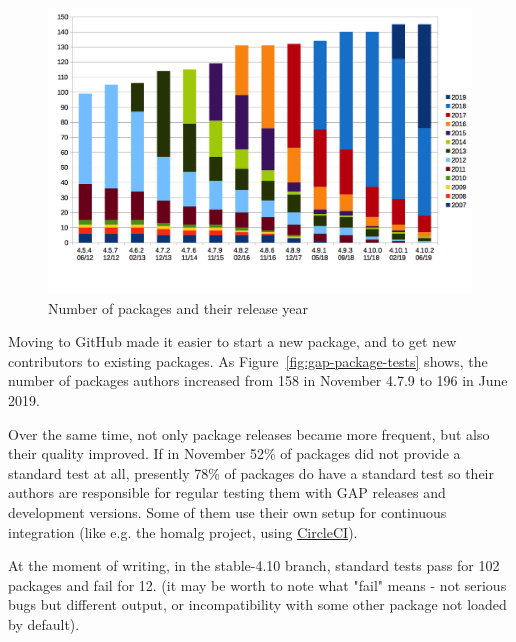 \documentclass{deliverablereport}
\begin{document}
\begin{figure}[!ht]
    \centering
    \includegraphics[width=\textwidth]{images/gap-package-releases}
    \caption{Number of \GAP packages and their release year}
    \label{fig:gap-package-releases}
\end{figure}

Moving to GitHub made it easier to start a new package, and to 
get new contributors to existing packages. As Figure~\ref{fig:gap-package-tests}
shows, the number of packages authors increased from 158 in
November 4.7.9 to 196 in June 2019. 

Over the same time, not only package releases became more frequent, but also their quality
improved. If in November 52\% of packages did not provide a standard 
test at all, presently 78\% of packages do have a standard test 
so their authors are responsible for regular testing them 
with GAP releases and development versions.
Some of them use their own setup for continuous integration
(like e.g. the {\sf homalg} project, using \href{https://circleci.com/}{CircleCI}).

At the moment of writing, in the stable-4.10 branch,
standard tests pass for 102 packages
and fail for 12.
(it may be worth to note what "fail" means - not serious bugs
but different output, or incompatibility with some other package
not loaded by default).
\end{document}
